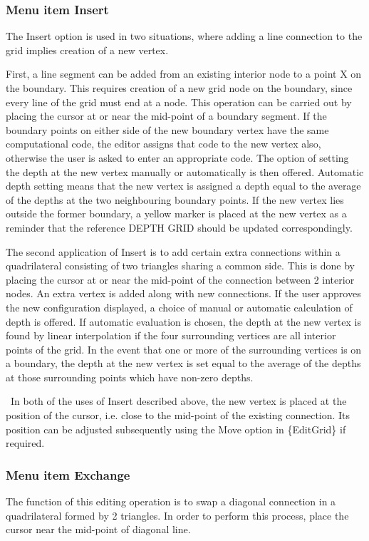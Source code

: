 \documentclass{article}
\begin{document}
\subsubsection[Menu item Insert]{Menu item Insert}
The Insert option is used in two situations, where adding a line connection to the grid implies creation of a new vertex. 

First, a line segment can be added from an existing interior node to a point X on the boundary. This requires creation of a new grid node on the boundary, since every line of the grid must end at a node. This operation can be carried out by placing the cursor at or near the mid-point of a boundary segment. If the boundary points on either side of the new boundary vertex have the same computational code, the editor assigns that code to the new vertex also, otherwise the user is asked to enter an appropriate code. The option of setting the depth at the new vertex manually or automatically is then offered. Automatic depth setting means that the new vertex is assigned a depth equal to the average of the depths at the two neighbouring boundary points. If the new vertex lies outside the former boundary, a yellow marker is placed at the new vertex as a reminder that the reference DEPTH GRID should be updated correspondingly.

The second application of Insert is to add certain extra connections within a quadrilateral consisting of two triangles sharing a common side. This is done by placing the cursor at or near the mid-point of the connection between 2 interior nodes. An extra vertex is added along with new connections. If the user approves the new configuration displayed, a choice of manual or automatic calculation of depth is offered. If automatic evaluation is chosen, the depth at the new vertex is found by linear interpolation if the four surrounding vertices are all interior points of the grid. In the event that one or more of the surrounding vertices is on a boundary, the depth at the new vertex is set equal to the average of the depths at those surrounding points which have non-zero depths.

\ In both of the uses of Insert described above, the new vertex is placed at the position of the cursor, i.e. close to the mid-point of the existing connection. Its position can be adjusted subsequently using the Move option in \{EditGrid\} if required.

\subsubsection[Menu item Exchange]{Menu item Exchange}
The function of this editing operation is to swap a diagonal connection in a quadrilateral formed by 2 triangles. In order to perform this process, place the cursor near the mid-point of diagonal line.
\end{document}
